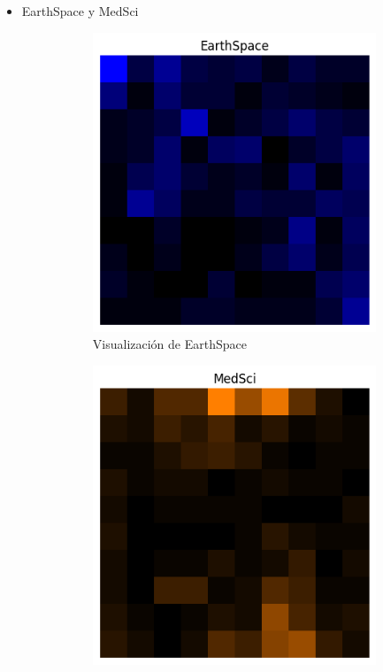 \documentclass{article}
\theoremstyle{mytheoremstyle}
\theoremstyle{mytheoremstyle}
\theoremstyle{myproblemstyle}
\begin{document}
\begin{itemize}
  \item EarthSpace y MedSci

        \begin{figure}[!ht]
          \centering
          \begin{subfigure}[b]{0.45\textwidth}
            \centering
            \includegraphics[width=\linewidth]{images/EarthSpace.png}
            \caption{Visualización de EarthSpace}
            \label{fig:EarthSpace}
          \end{subfigure}
          \begin{subfigure}[b]{0.45\textwidth}
            \centering
            \includegraphics[width=\linewidth]{images/MedSci.png}

\end{subfigure}
\end{figure}
\end{itemize}
\end{document}
